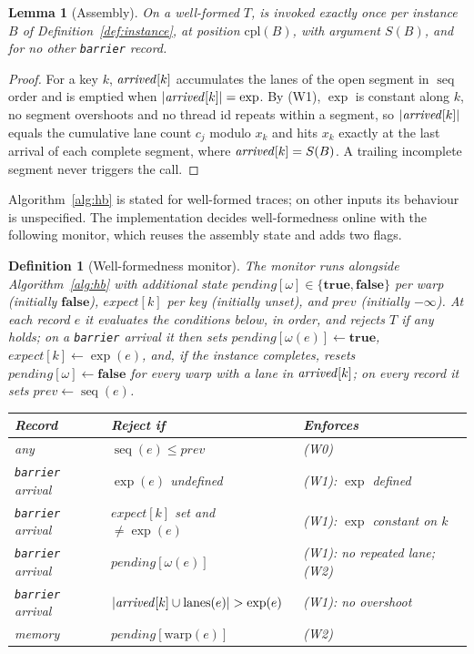 \documentclass[11pt]{article}
\newtheorem{lemma}[theorem]{Lemma}
\newtheorem{definition}[theorem]{Definition}
\theoremstyle{remark}
\DeclareMathOperator{\seq}{seq}
\begin{document}
\begin{lemma}[Assembly]\label{lem:assembly}
On a well-formed $T$, \Sync{} is invoked exactly once per instance $B$
of Definition~\ref{def:instance}, at position $\mathrm{cpl}(B)$, with
argument $S(B)$, and for no other \texttt{barrier} record.
\end{lemma}
\begin{proof}
For a key $k$, $\mathit{arrived}[k]$ accumulates the lanes of the open segment
in $\seq$ order and is emptied when $|\mathit{arrived}[k]|=\exp$. By (W1),
$\exp$ is constant along $k$, no segment overshoots and no thread id repeats
within a segment, so $|\mathit{arrived}[k]|$ equals the cumulative lane count
$c_j$ modulo $x_k$ and hits $x_k$ exactly at the last arrival of each complete
segment, where $\mathit{arrived}[k]=S(B)$. A trailing incomplete segment never
triggers the call.
\end{proof}

Algorithm~\ref{alg:hb} is stated for well-formed traces; on other inputs its
behaviour is unspecified. The implementation decides well-formedness online
with the following monitor, which reuses the assembly state and adds two
flags.

\begin{definition}[Well-formedness monitor]\label{def:monitor}
The monitor runs alongside Algorithm~\ref{alg:hb} with additional state
$\mathit{pending}[\omega]\in\{\mathbf{true},\mathbf{false}\}$ per warp
(initially $\mathbf{false}$), $\mathit{expect}[k]$ per key (initially unset),
and $\mathit{prev}$ (initially $-\infty$). At each record $e$ it evaluates the
conditions below, in order, and \emph{rejects} $T$ if any holds; on a
\texttt{barrier} arrival it then sets $\mathit{pending}[\omega(e)]\gets\mathbf{true}$,
$\mathit{expect}[k]\gets\exp(e)$, and, if the instance completes, resets
$\mathit{pending}[\omega]\gets\mathbf{false}$ for every warp with a lane in
$\mathit{arrived}[k]$; on every record it sets $\mathit{prev}\gets\seq(e)$.
\begin{center}
\begin{tabular}{lll}
\toprule
Record & Reject if & Enforces \\
\midrule
any & $\seq(e)\le\mathit{prev}$ & (W0) \\
\texttt{barrier} arrival & $\exp(e)$ undefined & (W1): $\exp$ defined \\
\texttt{barrier} arrival & $\mathit{expect}[k]$ set and $\ne\exp(e)$ & (W1): $\exp$ constant on $k$ \\
\texttt{barrier} arrival & $\mathit{pending}[\omega(e)]$ & (W1): no repeated lane; (W2) \\
\texttt{barrier} arrival & $|\arrv[k]\cup\text{lanes}(e)|>\exp(e)$ & (W1): no overshoot \\
memory & $\mathit{pending}[\mathrm{warp}(e)]$ & (W2) \\
\bottomrule
\end{tabular}
\end{center}
\end{definition}
\end{document}
